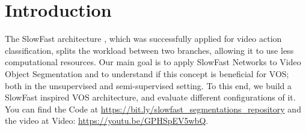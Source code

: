 \section{Introduction}
The SlowFast architecture \cite{slow_fast}, which was successfully applied for video action classification, splits the workload between two branches, allowing it to use less computational resources. 
Our main goal is to apply SlowFast Networks \cite{slow_fast}  to Video Object Segmentation and to understand if this concept is beneficial for VOS; both in the unsupervised and semi-supervised setting. To this end, we build a SlowFast inspired VOS architecture, and evaluate different configurations of it.
You can find the Code at \url{https://bit.ly/slowfast_segmentations_repository} and the video at
Video: \url{https://youtu.be/GPHSpEV5wbQ}.